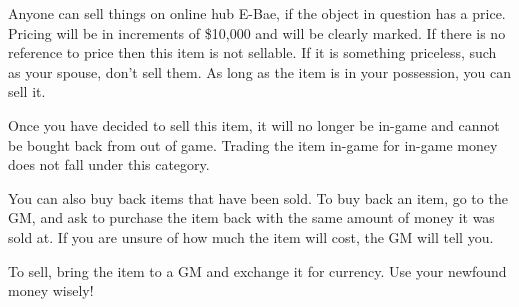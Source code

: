 \documentclass[green]{LRSguildcamp1}
\begin{document}
\name{\gSellingThing{}}
 
Anyone can sell things on online hub E-Bae, if the object in question has a price. Pricing will be in increments of \$10,000 and will be clearly marked. If there is no reference to price then this item is not sellable. If it is something priceless, such as your spouse, don't sell them.  As long as the item is in your possession, you can sell it. 

Once you have decided to sell this item, it will no longer be in-game and cannot be bought back from out of game. Trading the item in-game for in-game money does not fall under this category.  

You can also buy back items that have been sold. To buy back an item, go to the GM, and ask to purchase the item back with the same amount of money it was sold at. If you are unsure of how much the item will cost, the GM will tell you. 

To sell, bring the item to a GM and exchange it for currency. Use your newfound money wisely! 
\end{document}
